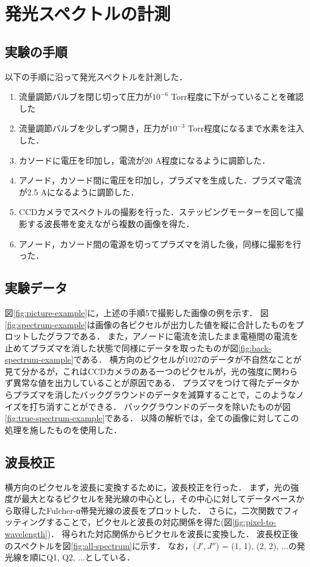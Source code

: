 \chapter{発光スペクトルの計測}
\section{実験の手順}
以下の手順に沿って発光スペクトルを計測した．
\begin{enumerate}
    \item 流量調節バルブを閉じ切って圧力が$10^{-6}$ Torr程度に下がっていることを確認した
    \item 流量調節バルブを少しずつ開き，圧力が$10^{-3}$ Torr程度になるまで水素を注入した．
    \item カソードに電圧を印加し，電流が20 A程度になるように調節した．
    \item アノード，カソード間に電圧を印加し，プラズマを生成した．プラズマ電流が2.5 Aになるように調節した．
    \item CCDカメラでスペクトルの撮影を行った．ステッピングモーターを回して撮影する波長帯を変えながら複数の画像を得た．
    \item アノード，カソード間の電源を切ってプラズマを消した後，同様に撮影を行った．
\end{enumerate}

\section{実験データ}
図\ref{fig:picture-example}に，上述の手順5で撮影した画像の例を示す．
図\ref{fig:spectrum-example}は画像の各ピクセルが出力した値を縦に合計したものをプロットしたグラフである．
また，アノードに電流を流したまま電極間の電流を止めてプラズマを消した状態で同様にデータを取ったものが図\ref{fig:back-spectrum-example}である．
横方向のピクセルが1027のデータが不自然なことが見て分かるが，これはCCDカメラのある一つのピクセルが，光の強度に関わらず異常な値を出力していることが原因である．
プラズマをつけて得たデータからプラズマを消したバックグラウンドのデータを減算することで，このようなノイズを打ち消すことができる．
バックグラウンドのデータを除いたものが図\ref{fig:true-spectrum-example}である．
以降の解析では，全ての画像に対してこの処理を施したものを使用した．

\section{波長校正}
横方向のピクセルを波長に変換するために，波長校正を行った．
まず，光の強度が最大となるピクセルを発光線の中心とし，その中心に対してデータベース\cite{H2-spectrum-data}から取得したFulcher-α帯発光線の波長をプロットした．
さらに，二次関数でフィッティングすることで，ピクセルと波長の対応関係を得た(図\ref{fig:pixel-to-wavelength})．
得られた対応関係からピクセルを波長に変換した．
波長校正後のスペクトルを図\ref{fig:all-spectrum}に示す．
なお，($J', J''$) = (1, 1), (2, 2), ...の発光線を順にQ1, Q2, ...としている．